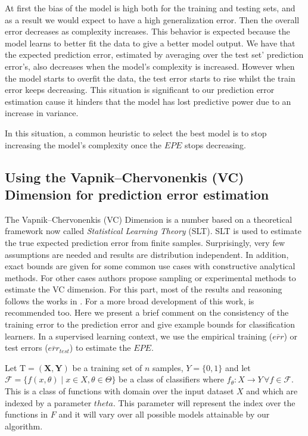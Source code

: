 At first the bias of the model is high both for the training and testing sets, and as a result we would expect to have a high generalization error. Then the overall error decreases as complexity increases. This behavior is expected because the model learns to better fit the data to give a better model output. We have that the expected prediction error, estimated by averaging over the test set' prediction error's, also decreases when the model's complexity is increased. However when the model starts to overfit the data, the test error starts to rise whilst the train error keeps decreasing. This situation is significant to our prediction error estimation cause it hinders that the model has lost predictive power due to an increase in variance.

In this situation, a common heuristic to select the best model is to stop increasing the model's complexity once the $EPE$ stops decreasing.

\subsection{ Using the Vapnik--Chervonenkis (VC) Dimension for prediction error estimation} \label{section-VcDimension}


The Vapnik--Chervonenkis (VC) Dimension is a number based on a theoretical framework now called \textit{Statistical Learning Theory} (SLT). SLT is used to estimate the true expected prediction error from finite samples. Surprisingly, very few assumptions are needed and results are distribution independent. In addition, exact bounds are given for some common use cases with constructive analytical methods. For other cases authors propose sampling or experimental methods to estimate the VC dimension. For this part, most of the results and reasoning follows the works in \textcite{cherkassky-learning2007}. For a more broad development of this work, \textcite{vapnik-nature2013} is recommended too. Here we present a brief comment on the consistency of the training error to the prediction error and give example bounds for classification learners. In a supervised learning context, we use the empirical training ($\overline{err}$) or test errors ($\overline{err}_{test}$) to estimate the $EPE$.

Let $\mathrm{T} = (\textbf{X},\textbf{Y})$ be a training set of $n$ samples, $Y = \{0,1 \}$ and let $\mathcal {F} = \{f(x,\theta) \mid x \in X, \theta \in \Theta\}$ be a class of classifiers where $f_\theta: X \rightarrow Y \, \forall f \in \mathcal {F}$. This is a class of functions with domain over the input dataset $X$ and which are indexed by a parameter $theta$. This parameter will represent the index over the functions in $F$ and it will vary over all possible models attainable by our algorithm.

